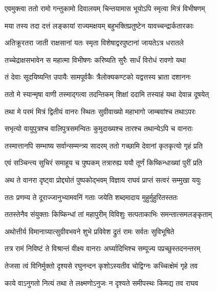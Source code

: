 \twolineshloka
{एवमुक्त्वा ततो रामो गन्तुकामो दिवालयम्}
{चिन्तयामास भूयोऽपि स्मृत्वा मित्रं विभीषणम्}%

\twolineshloka
{मया तस्य तदा दत्तं लङ्कायां राज्यमक्षयम्}
{बहुभक्तिप्रतुष्टेन यावच्चन्द्रार्कतारकाः}%

\twolineshloka
{अतिक्रूरतरा जाती राक्षसानां यतः स्मृता}
{विशेषाद्वरपुष्टानां जायतेऽत्र धरातले}%

\twolineshloka
{तच्चेद्राक्षसभावेन स महात्मा विभीषणः}
{करिष्यति सुरैः सार्धं विरोधं रावणो यथा}%

\twolineshloka
{तं देवाः सूदयिष्यन्ति उपायैः सामपूर्वकैः}
{त्रैलोक्यकण्टको यद्वत्तस्य भ्राता दशाननः}%

\twolineshloka
{ततो मे स्यान्मृषा वाणी तस्माद्गत्वा तदन्तिकम्}
{शिक्षां ददामि तस्याहं यथा देवान्न दूषयेत्}%

\twolineshloka
{तथा मे परमं मित्रं द्वितीयं वानरः स्थितः}
{सुग्रीवाख्यो महाभागो जाम्बवांश्च तथाऽपरः}%

\twolineshloka
{सभृत्यो वायुपुत्रश्च वालिपुत्रसमन्वितः}
{कुमुदाख्यश्च तारश्च तथान्येऽपि च वानराः}%

\twolineshloka
{तस्मात्तानपि सम्भाष्य सर्वान्सम्मन्त्र्य सादरम्}
{ततो गच्छामि देवानां कृतकृत्यो गृहं प्रति}%

\twolineshloka
{एवं सञ्चिन्त्य सुचिरं समाहूय च पुष्पकम्}
{तत्रारुह्य ययौ तूर्णं किष्किन्धाख्यां पुरीं प्रति}%

\twolineshloka
{अथ ते वानरा दृष्ट्वा प्रोद्द्योतं पुष्पकोद्भवम्}
{विज्ञाय राघवं प्राप्तं सत्वरं सम्मुखा ययुः}%

\twolineshloka
{ततः प्रणम्य ते दूराज्जानुभ्यामवनिं गताः}
{जयेति शब्दमादाय मुहुर्मुहुरितस्ततः}%

\twolineshloka
{ततस्तेनैव संयुक्ताः किष्किन्धां तां महापुरीम्}
{विविशुः सत्पताकाभिः समन्तात्समलङ्कृताम्}%

\twolineshloka
{अथोत्तीर्य विमानाग्र्यात्सुग्रीवभवने शुभे}
{प्रविवेश द्रुतं रामः सर्वतः सुविभूषिते}%

\twolineshloka
{तत्र रामं निविष्टं ते विश्रान्तं वीक्ष्य वानराः}
{अर्घ्यादिभिश्च सम्पूज्य पप्रच्छुस्तदनन्तरम्}%


\twolineshloka
{तेजसा त्वं विनिर्मुक्तो दृश्यसे रघुनन्दन}
{कृशोऽस्यतीव चोद्विग्नः कच्चित्क्षेमं गृहे तव}%

\twolineshloka
{काये वाऽनुगतो नित्यं तथा ते लक्ष्मणोऽनुजः}
{न दृश्यते समीपस्थः किमद्य तव राघव}%

